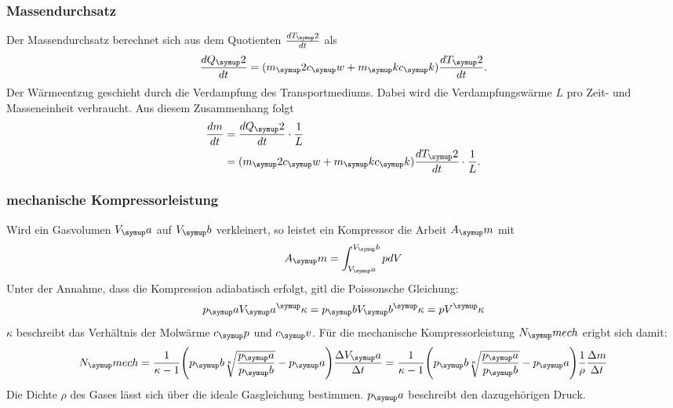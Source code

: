 \subsubsection{Massendurchsatz}
Der Massendurchsatz berechnet sich aus dem Quotienten $\frac{dT_\su{2}}{dt}$ als
\begin{equation}
  \frac{dQ_\su{2}}{dt}= (m_\su{2}c_\su{w}+m_\su{k}c_\su{k})\frac{dT_\su{2}}{dt}.
\end{equation}
Der Wärmeentzug geschieht durch die Verdampfung des Transportmediums. Dabei wird die
Verdampfungswärme $L$ pro Zeit- und Masseneinheit verbraucht. Aus diesem Zusammenhang folgt
\begin{align}
  \frac{dm}{dt} &= \frac{dQ_\su{2}}{dt} \cdot \frac{1}{L} \\
      &= (m_\su{2}c_\su{w}+m_\su{k}c_\su{k})\frac{dT_\su{2}}{dt} \cdot \frac{1}{L}.
\end{align}
\subsubsection{mechanische Kompressorleistung}
Wird ein Gasvolumen $V_\su{a}$ auf $V_\su{b}$ verkleinert, so leistet ein Kompressor
die Arbeit $A_\su{m}$ mit
\begin{equation}
  A_\su{m} = \int_{V_\su{a}}^{V_\su{b}}pdV
\end{equation}
Unter der Annahme, dass die Kompression adiabatisch erfolgt, gitl die Poissonsche
Gleichung:
\begin{equation}
  p_\su{a}V_\su{a}^\su{\kappa} = p_\su{b}V_\su{b}^\su{\kappa} = pV^\su{\kappa}
\end{equation}
$\kappa$ beschreibt das Verhältnis der Molwärme $c_\su{p}$ und $c_\su{v}$.
Für die mechanische Kompressorleistung $N_\su{mech}$ erigbt sich damit:
\begin{equation}
  N_\su{mech}= \frac{1}{\kappa-1}\Biggl(p_\su{b}\sqrt[\kappa]{\frac{p_\su{a}}{p_\su{b}}}-p_\su{a}
  \Biggr)\frac{\Delta V_\su{a}}{\Delta t} = \frac{1}{\kappa-1}\Biggl(p_\su{b}\sqrt[\kappa]{\frac{p_\su{a}}{p_\su{b}}}-p_\su{a}
  \Biggr)\frac{1}{\rho}\frac{\Delta m}{\Delta t}
\end{equation}
Die Dichte $\rho$ des Gases lässt sich über die ideale Gasgleichung bestimmen.
$p_\su{a}$ beschreibt den dazugehörigen Druck.
